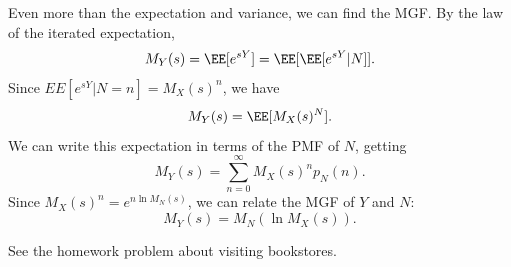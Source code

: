\documentclass{ximera}
\begin{document}
Even more than the expectation and variance, we can find the MGF. By the law of the iterated expectation,
$$
M_Y(s) = \EE[e^{sY}] = \EE[\EE[e^{sY} \vert N]].
$$
Since $EE[e^{sY} \vert N=n] = M_X(s)^n$, we have
$$
M_Y(s) = \EE[M_X(s)^N].
$$
We can write this expectation in terms of the PMF of $N$, getting
$$
M_Y(s) = \sum_{n=0}^{\infty} M_X(s)^n p_N(n).
$$
Since $M_X(s)^n = e^{n\ln M_N(s)}$, we can relate the MGF of $Y$ and $N$:
$$
M_Y(s) = M_N(\ln M_X(s)).
$$

\begin{example}
See the homework problem about visiting bookstores. 
\end{example}


\newpage
\end{document}
